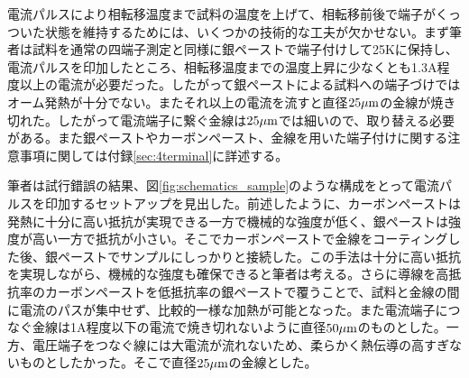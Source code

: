 電流パルスにより相転移温度まで試料の温度を上げて、相転移前後で端子がくっついた状態を維持するためには、いくつかの技術的な工夫が欠かせない。まず筆者は試料を通常の四端子測定と同様に銀ペーストで端子付けして25Kに保持し、電流パルスを印加したところ、相転移温度までの温度上昇に少なくとも1.3A程度以上の電流が必要だった。したがって銀ペーストによる試料への端子づけではオーム発熱が十分でない。またそれ以上の電流を流すと直径$\rm 25 \mu m$の金線が焼き切れた。したがって電流端子に繋ぐ金線は$\rm 25 \mu m$では細いので、取り替える必要がある。また銀ペーストやカーボンペースト、金線を用いた端子付けに関する注意事項に関しては付録\ref{sec:4terminal}に詳述する。

筆者は試行錯誤の結果、図\ref{fig:schematics_sample}のような構成をとって電流パルスを印加するセットアップを見出した。前述したように、カーボンペーストは発熱に十分に高い抵抗が実現できる一方で機械的な強度が低く、銀ペーストは強度が高い一方で抵抗が小さい。そこでカーボンペーストで金線をコーティングした後、銀ペーストでサンプルにしっかりと接続した。この手法は十分に高い抵抗を実現しながら、機械的な強度も確保できると筆者は考える。さらに導線を高抵抗率のカーボンペーストを低抵抗率の銀ペーストで覆うことで、試料と金線の間に電流のパスが集中せず、比較的一様な加熱が可能となった。また電流端子につなぐ金線は1A程度以下の電流で焼き切れないように直径$\rm 50 \mu m$のものとした。一方、電圧端子をつなぐ線には大電流が流れないため、柔らかく熱伝導の高すぎないものとしたかった。そこで直径$\rm 25 \mu m$の金線とした。

